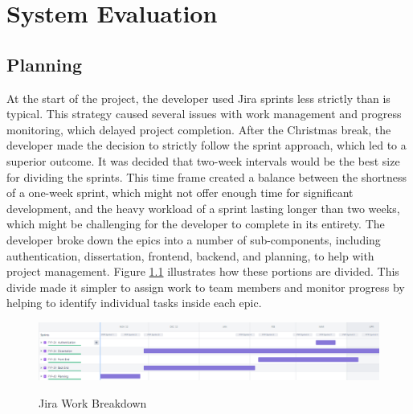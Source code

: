 \chapter{System Evaluation}

\section{Planning}
At the start of the project, the developer used Jira sprints less strictly than is typical. This strategy caused several issues with work management and progress monitoring, which delayed project completion. After the Christmas break, the developer made the decision to strictly follow the sprint approach, which led to a superior outcome.
It was decided that two-week intervals would be the best size for dividing the sprints. This time frame created a balance between the shortness of a one-week sprint, which might not offer enough time for significant development, and the heavy workload of a sprint lasting longer than two weeks, which might be challenging for the developer to complete in its entirety.
The developer broke down the epics into a number of sub-components, including authentication, dissertation, frontend, backend, and planning, to help with project management. Figure \ref{image:workbreakdown} illustrates how these portions are divided. This divide made it simpler to assign work to team members and monitor progress by helping to identify individual tasks inside each epic.
\begin{figure}[h!]
    \includegraphics[width=1.0\textwidth]{images/JiraWorkBreakdown.png}
    \centering
    \label{image:workbreakdown}
    \caption{Jira Work Breakdown}
\end{figure}


